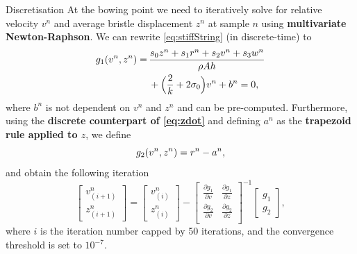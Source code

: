 \documentclass[a0paper,portrait]{baposter}
\let\oldbf\textbf
\renewcommand{\textbf}[1]{\textcolor{aaublue1}{\oldbf{#1}}}
\begin{document}
\begin{poster}
\begin{posterbox}[name=discretisation, column=1, below=elasto2,above=bottom]{Discretisation}
    At the bowing point we need to iteratively solve for relative velocity $v^n$ and average bristle displacement $z^n$ at sample $n$ using \textbf{multivariate Newton-Raphson}.
    We can rewrite \eqref{eq:stiffString} (in discrete-time) to
    \vspace{-0.3em}
    \begin{equation}
    \begin{aligned}
        g_1(v^n, z^n) = \, &\frac{s_0z^n+s_1r^n+s_2v^n+s_3w^n}{\rho A h}
    \\&+\Big(\frac{2}{k} + 2\sigma_0 \Big)v^n
    + b^n= 0,
    \end{aligned}\vspace{-0.2em}
    \end{equation}
    where $b^n$ is not dependent on $v^n$ and $z^n$ and can be pre-computed. Furthermore, using the \textbf{discrete counterpart of \eqref{eq:zdot}} and defining $a^n$ as the \textbf{trapezoid rule applied to $z$}, we define
    \vspace{-0.3em}\begin{equation}
        g_2(v^n, z^n) = r^n - a^n ,
        \vspace{-0.3em}
    \end{equation}
    and obtain the following iteration
    \begin{equation}\label{eq:NRit}
    \begin{bmatrix}
    v_{(i+1)}^n\\
    z_{(i+1)}^n
    \end{bmatrix}
    =
    \begin{bmatrix}
    v_{(i)}^n\\
    z_{(i)}^n
    \end{bmatrix}
    -
    \begin{bmatrix}
    \frac{\partial g_1}{\partial v} & \frac{\partial g_1}{\partial z}\\
    \frac{\partial g_2}{\partial v} & \frac{\partial g_2}{\partial z}\\
    \end{bmatrix}^{-1}
    \begin{bmatrix}
    g_1\\
    g_2
    \end{bmatrix}
    ,
\end{equation}
where $i$ is the iteration number capped by 50 iterations, and the convergence threshold is set to $10^{-7}$.


\end{posterbox}
\end{poster}
\end{document}
